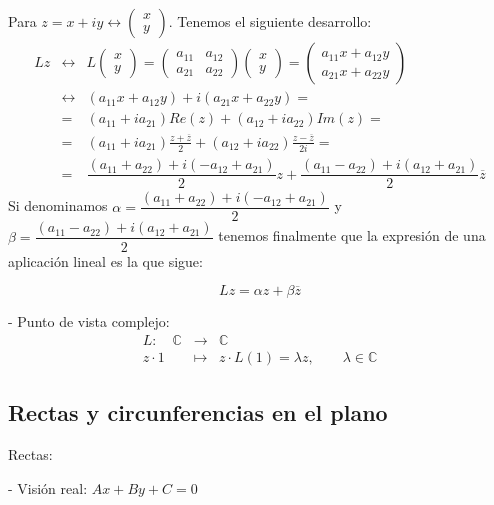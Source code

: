 Para \(z = x+iy \leftrightarrow \begin{pmatrix}
 x \\
 y
\end{pmatrix} \). Tenemos el siguiente desarrollo:
\begin{eqnarray*}
  Lz & \leftrightarrow & L\begin{pmatrix}
    x \\
    y
  \end{pmatrix} = \begin{pmatrix}
  a_{11} & a_{12} \\
  a_{21} & a_{22}
  \end{pmatrix}\begin{pmatrix}
    x \\
    y
  \end{pmatrix} = \begin{pmatrix}
  a_{11}x + a_{12}y \\
  a_{21}x + a_{22}y
  \end{pmatrix} \\
   & \leftrightarrow & (a_{11}x + a_{12}y)+i(a_{21}x + a_{22}y) = \\
   & = & (a_{11}+ia_{21})Re(z) + (a_{12}+ia_{22})Im(z) = \\
   & = & (a_{11}+ia_{21})\frac{z+\overline{z}}{2} + (a_{12}+ia_{22})\frac{z-\overline{z}}{2i} = \\
   & = & \dfrac{(a_{11}+a_{22})+i(-a_{12}+a_{21})}{2}z+\dfrac{(a_{11}-a_{22})+i(a_{12}+a_{21})}{2}\overline{z}
\end{eqnarray*}
Si denominamos \( \alpha = \dfrac{(a_{11}+a_{22})+i(-a_{12}+a_{21})}{2} \) y \( \beta = \dfrac{(a_{11}-a_{22})+i(a_{12}+a_{21})}{2} \) tenemos finalmente que la expresión de una aplicación lineal es la que sigue:

\[Lz = \alpha z + \beta \overline{z}\]

- Punto de vista complejo:
\begin{eqnarray*}
  L : \quad \mathbb{C}^{ } & \rightarrow & \mathbb{C}^{} \\
  z \cdot 1 & \mapsto & z \cdot L(1) = \lambda z,  \qquad \lambda \in \mathbb{C}
\end{eqnarray*}

\subsection{Rectas y circunferencias en el plano}

Rectas:

- Visión real: \(Ax + By + C = 0\)

